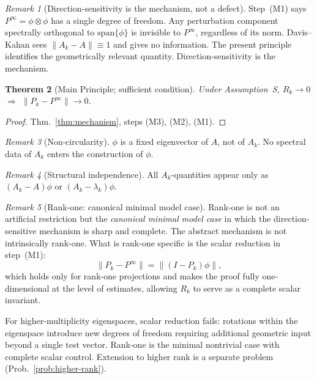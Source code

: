 \documentclass[12pt,a4paper]{amsart}
\newtheorem{theorem}{Theorem}[section]
\theoremstyle{definition}
\theoremstyle{remark}
\newtheorem{remark}[theorem]{Remark}
\begin{document}
\begin{remark}[Direction-sensitivity
  is the mechanism, not a defect]
\label{rem:block-is-the-point}
Step~(M1) says $P^\infty=\phi\otimes\phi$
has a single degree of freedom.
Any perturbation component spectrally
orthogonal to $\mathrm{span}\{\phi\}$
is invisible to $P^\infty$,
regardless of its norm.
Davis--Kahan sees $\|A_k-A\|\equiv 1$
and gives no information.
The present principle identifies the
geometrically relevant quantity.
Direction-sensitivity is the mechanism.
\end{remark}

\begin{theorem}[Main Principle;
  sufficient condition]
\label{thm:abstract}
Under Assumption~S,
$R_k\to 0$
$\Rightarrow$
$\|P_k-P^\infty\|\to 0$.
\end{theorem}
\begin{proof}
Thm.~\ref{thm:mechanism},
steps (M3), (M2), (M1).
\end{proof}

\begin{remark}[Non-circularity]
\label{rem:non-circularity}
$\phi$ is a fixed eigenvector of $A$,
not of $A_k$. No spectral data of
$A_k$ enters the construction of $\phi$.
\end{remark}

\begin{remark}[Structural independence]
\label{rem:structural-independence}
All $A_k$-quantities appear only as
$(A_k-A)\phi$ or $(A_k-\lambda_k)\phi$.
\end{remark}

\begin{remark}[Rank-one: canonical
  minimal model case]
\label{rem:rank-one-scope}
Rank-one is not an artificial
restriction but the \emph{canonical
minimal model case} in which the
direction-sensitive mechanism is
sharp and complete.
The abstract mechanism is not
intrinsically rank-one.
What is rank-one specific is the
scalar reduction in step~(M1):
\[
  \|P_k - P^\infty\|
  = \|(I-P_k)\phi\|,
\]
which holds only for rank-one
projections and makes the proof
fully one-dimensional at the level
of estimates, allowing $R_k$ to
serve as a complete scalar invariant.

For higher-multiplicity eigenspaces,
scalar reduction fails: rotations
within the eigenspace introduce new
degrees of freedom requiring
additional geometric input beyond
a single test vector.
Rank-one is the minimal nontrivial
case with complete scalar control.
Extension to higher rank is a separate
problem
(Prob.~\ref{prob:higher-rank}).
\end{remark}
\end{document}
